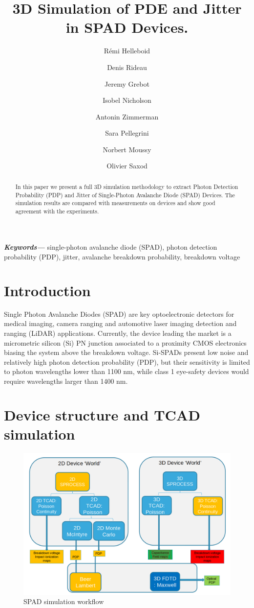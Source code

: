 \documentclass[10pt,a4paper,twocolumn]{article}
\title{3D Simulation of PDE and Jitter in SPAD Devices.}
\author[1]{Rémi Helleboid}
\author[1]{Denis Rideau}
\author[1]{Jeremy Grebot}
\author[1]{Isobel Nicholson}
\author[1]{Antonin Zimmerman}
\author[1]{Sara Pellegrini}
\author[2]{Norbert Moussy}
\author[2]{Olivier Saxod}
\affil[1]{ST Microelectronics, Crolles, France}
\affil[2]{CEA LETI, Grenoble, France}
\date{}                     %
\providecommand{\keywords}[1]
{
  \small	
  \textbf{\textit{Keywords---}} #1
}
\begin{document}
\maketitle

\begin{abstract}
In this paper we present a full 3D simulation methodology to extract Photon Detection Probability (PDP) and Jitter of Single-Photon Avalanche Diode (SPAD) Devices. The simulation results are compared with measurements on devices and show good agreement with the experiments.\\
\end{abstract}

\keywords{single-photon avalanche diode (SPAD), photon detection probability (PDP), jitter, avalanche breakdown probability, breakdown voltage}

\section{Introduction}
Single Photon Avalanche Diodes (SPAD) are key optoelectronic detectors for medical imaging, camera ranging and automotive laser imaging detection and ranging (LiDAR) applications. Currently, the device leading the market is a micrometric silicon (Si) PN junction associated to a proximity CMOS electronics biasing the system above the breakdown voltage. Si-SPADs present low noise and relatively high photon detection probability (PDP), but their sensitivity is limited to photon wavelengths lower than 1100 nm, while class 1 eye-safety devices would require wavelengths larger than 1400 nm.


\section{Device structure and TCAD simulation}
\begin{figure}[hbtp]
\caption{SPAD simulation workflow}
\includegraphics[scale=0.21]{../pictures/TCADWorkflow.png}
\end{figure}
\end{document}
